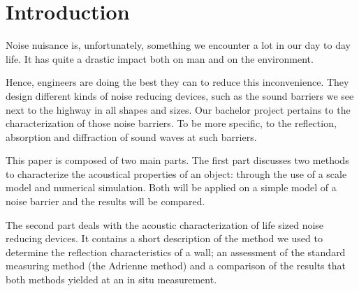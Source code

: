 \section{Introduction}
Noise nuisance is, unfortunately, something we encounter a lot in our day to day life. It has quite a drastic impact both on man\cite{noise-on-man} and on the environment\cite{noise-on-env}.

Hence, engineers are doing the best they can to reduce this inconvenience. They design different kinds of noise reducing devices, such as the sound barriers we see next to the highway in all shapes and sizes. Our bachelor project pertains to the characterization of those noise barriers. To be more specific, to the reflection, absorption and diffraction of sound waves at such barriers.

This paper is composed of two main parts. The first part discusses two methods to characterize the acoustical properties of an object: through the use of a scale model and numerical simulation. Both will be applied on a simple model of a noise barrier and the results will be compared.

The second part deals with the acoustic characterization of life sized noise reducing devices. It contains a short description of the method we used to determine the reflection characteristics of a wall; an assessment of the standard measuring method (the Adrienne method) and a comparison of the results that both methods yielded at an in situ measurement.

